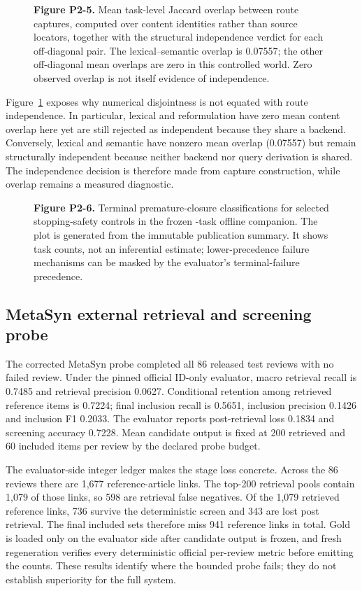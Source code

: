 \begin{figure}[t]
\centering

\caption{\textbf{Figure P2-5.} Mean task-level Jaccard overlap between route
captures, computed over content identities rather than source locators, together
with the structural independence verdict for each off-diagonal pair.  The
lexical--semantic overlap is 0.07557; the other off-diagonal mean overlaps are
zero in this controlled world.  Zero observed overlap is not itself evidence of
independence.}
\label{fig:p2-5}
\end{figure}

Figure~\ref{fig:p2-5} exposes why numerical disjointness is not equated with
route independence.  In particular, lexical and reformulation have zero
mean content overlap here yet are still rejected as independent because they
share a backend.  Conversely, lexical and semantic have nonzero mean overlap
(0.07557) but remain structurally independent because neither backend nor query
derivation is shared.  The independence decision is therefore made from capture
construction, while overlap remains a measured diagnostic.

\begin{figure}[t]
\centering

\caption{\textbf{Figure P2-6.} Terminal premature-closure classifications for
selected stopping-safety controls in the frozen \OfflineTaskCount{}-task offline companion.  The
plot is generated from the immutable publication summary.  It shows task counts,
not an inferential estimate; lower-precedence failure mechanisms can be masked by
the evaluator's terminal-failure precedence.}
\label{fig:p2-6}
\end{figure}

\subsection{MetaSyn external retrieval and screening probe}
The corrected MetaSyn probe completed all 86 released test reviews with no
failed review.  Under the pinned official ID-only evaluator, macro retrieval
recall is 0.7485 and retrieval precision 0.0627.  Conditional retention among
retrieved reference items is 0.7224; final inclusion recall is 0.5651,
inclusion precision 0.1426 and inclusion F1 0.2033.  The evaluator reports
post-retrieval loss 0.1834 and screening accuracy 0.7228.  Mean candidate output
is fixed at 200 retrieved and 60 included items per review by the declared
probe budget.

The evaluator-side integer ledger makes the stage loss concrete.  Across the 86
reviews there are 1,677 reference-article links.  The top-200 retrieval pools
contain 1,079 of those links, so 598 are retrieval false negatives.  Of the
1,079 retrieved reference links, 736 survive the deterministic screen and 343
are lost post retrieval.  The final included sets therefore miss 941 reference
links in total.  Gold is loaded only on the evaluator side after candidate
output is frozen, and fresh regeneration verifies every deterministic official
per-review metric before emitting the counts.  These results identify where the
bounded probe fails; they do not establish superiority for the full system.

